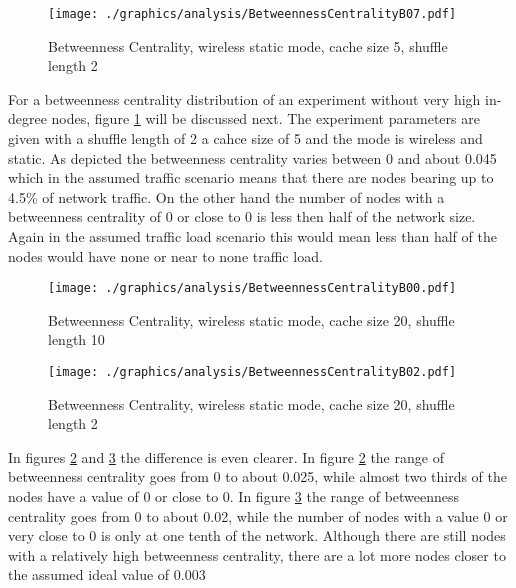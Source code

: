 \begin{figure}
	\texttt{[image: ./graphics/analysis/BetweennessCentralityB07.pdf]}
	\caption{Betweenness Centrality, wireless static mode, cache size 5, shuffle
	length 2}
	\label{fig:betweennessB07}
\end{figure}


For a betweenness centrality distribution of an experiment without
very high in-degree nodes, figure \ref{fig:betweennessB07} will be discussed
next. The experiment parameters are given with a shuffle length of 2 a cahce
size of 5 and the mode is wireless and static. As depicted the betweenness
centrality varies between 0 and about 0.045 which in the assumed traffic
scenario means that there are nodes bearing up to 4.5\% of network traffic. On
the other hand the number of nodes with a betweenness centrality of 0 or close
to 0 is less then half of the network size. Again in the assumed traffic load
scenario this would mean less than half of the nodes would have none or near to
none traffic load. \\

\begin{figure}
	\texttt{[image: ./graphics/analysis/BetweennessCentralityB00.pdf]}
	\caption{Betweenness Centrality, wireless static mode, cache size 20, shuffle
	length 10}
	\label{fig:betweennessB00}
\end{figure}

\begin{figure}
	\texttt{[image: ./graphics/analysis/BetweennessCentralityB02.pdf]}
	\caption{Betweenness Centrality, wireless static mode, cache size 20, shuffle
	length 2}
	\label{fig:betweennessB02}
\end{figure}

In figures \ref{fig:betweennessB00} and \ref{fig:betweennessB02} the difference
is even clearer. In figure \ref{fig:betweennessB00} the range of betweenness
centrality goes from 0 to about 0.025, while almost two thirds of the nodes
have a value of 0 or close to 0. In figure \ref{fig:betweennessB02} the range
of betweenness centrality goes from 0 to about 0.02, while the number of nodes
with a value 0 or very close to 0 is only at one tenth of the network. Although
there are still nodes with a relatively high betweenness centrality, there
are a lot more nodes closer to the assumed ideal value of 0.003

